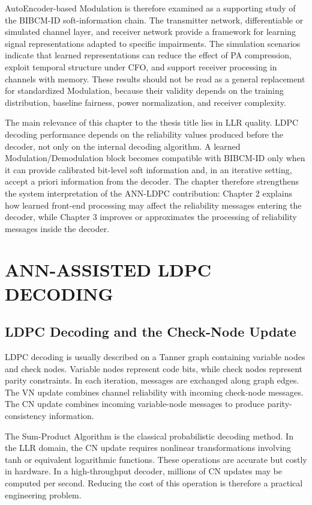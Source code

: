 AutoEncoder-based Modulation is therefore examined as a supporting study of the BIBCM-ID soft-information chain. The transmitter network, differentiable or simulated channel layer, and receiver network provide a framework for learning signal representations adapted to specific impairments. The simulation scenarios indicate that learned representations can reduce the effect of PA compression, exploit temporal structure under CFO, and support receiver processing in channels with memory. These results should not be read as a general replacement for standardized Modulation, because their validity depends on the training distribution, baseline fairness, power normalization, and receiver complexity.

The main relevance of this chapter to the thesis title lies in LLR quality. LDPC decoding performance depends on the reliability values produced before the decoder, not only on the internal decoding algorithm. A learned Modulation/Demodulation block becomes compatible with BIBCM-ID only when it can provide calibrated bit-level soft information and, in an iterative setting, accept a priori information from the decoder. The chapter therefore strengthens the system interpretation of the ANN-LDPC contribution: Chapter 2 explains how learned front-end processing may affect the reliability messages entering the decoder, while Chapter 3 improves or approximates the processing of reliability messages inside the decoder.

\chapter[\textbf{ANN-ASSISTED LDPC DECODING}]{ANN-ASSISTED LDPC DECODING}
\section{LDPC Decoding and the Check-Node Update}
LDPC decoding is usually described on a Tanner graph containing variable nodes and check nodes. Variable nodes represent code bits, while check nodes represent parity constraints. In each iteration, messages are exchanged along graph edges. The VN update combines channel reliability with incoming check-node messages. The CN update combines incoming variable-node messages to produce parity-consistency information.

The Sum-Product Algorithm is the classical probabilistic decoding method. In the LLR domain, the CN update requires nonlinear transformations involving tanh or equivalent logarithmic functions. These operations are accurate but costly in hardware. In a high-throughput decoder, millions of CN updates may be computed per second. Reducing the cost of this operation is therefore a practical engineering problem.

